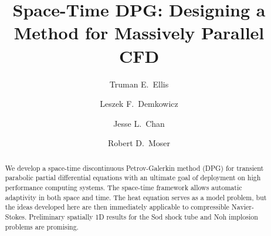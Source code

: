 \documentclass[preprint,12pt]{elsarticle}
\begin{document}
\begin{frontmatter}



\title{Space-Time DPG: Designing a Method for Massively Parallel CFD}


\author[ices]{Truman E.~Ellis}
\author[ices]{Leszek F.~Demkowicz}
\author[rice]{Jesse L.~Chan}
\author[ices]{Robert D.~Moser}

\address[ices]{Institute for Computational Engineering and Sciences,
University of Texas at Austin
201 East 24th St, Stop C0200, Austin, TX 78703}
\address[rice]{Computational and Applied Mathematics,
Rice University
6100 Main MS-134, Houston, TX 77005}

\begin{abstract}
We develop a space-time discontinuous Petrov-Galerkin method (DPG) for transient parabolic partial differential equations
with an ultimate goal of deployment on high performance computing systems.
The space-time framework allows automatic adaptivity in both space and time.
The heat equation serves as a model problem, but the ideas developed here are then immediately applicable to compressible Navier-Stokes.
Preliminary spatially 1D results for the Sod shock tube and Noh implosion problems are promising.


\end{abstract}
\end{frontmatter}
\end{document}
